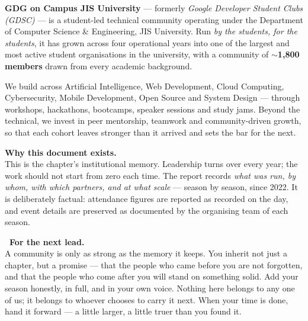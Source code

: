 \documentclass[11pt,a4paper]{article}
\begin{document}
\textbf{GDG on Campus JIS University} — formerly \emph{Google Developer Student Clubs (GDSC)} —
is a student-led technical community operating under the Department of Computer Science \&
Engineering, JIS University. Run \emph{by the students, for the students}, it has grown across
four operational years into one of the largest and most active student organisations in the
university, with a community of \textbf{$\sim$1{,}800 members} drawn from every academic
background.

We build across Artificial Intelligence, Web Development, Cloud Computing, Cybersecurity, Mobile
Development, Open Source and System Design — through workshops, hackathons, bootcamps, speaker
sessions and study jams. Beyond the technical, we invest in peer mentorship, teamwork and
community-driven growth, so that each cohort leaves stronger than it arrived and sets the bar for
the next.

\vspace{4pt}
\begin{tcolorbox}[enhanced,colback=Mist,colframe=Mist,arc=4pt,left=14pt,right=14pt,top=10pt,bottom=10pt,
    borderline west={3pt}{0pt}{GBlue}]
  {\bfseries\color{Ink}Why this document exists.}\\[2pt]
  This is the chapter's institutional memory. Leadership turns over every year; the work should not
  start from zero each time. The report records \emph{what was run, by whom, with which partners, and
  at what scale} — season by season, since 2022. It is deliberately factual: attendance figures are
  reported as recorded on the day, and event details are preserved as documented by the organising
  team of each season.
\end{tcolorbox}

\begin{tcolorbox}[enhanced,colback=white,colframe=GGrn,boxrule=1pt,arc=4pt,
    left=14pt,right=14pt,top=10pt,bottom=10pt]
  {\bfseries\color{GGrn}\faArrowRight~For the next lead.}\\[2pt]
  A community is only as strong as the memory it keeps. You inherit not just a chapter, but a
  promise — that the people who came before you are not forgotten, and that the people who come
  after you will stand on something solid. Add your season honestly, in full, and in your own voice.
  Nothing here belongs to any one of us; it belongs to whoever chooses to carry it next. When your
  time is done, hand it forward — a little larger, a little truer than you found it.
\end{tcolorbox}
\end{document}
